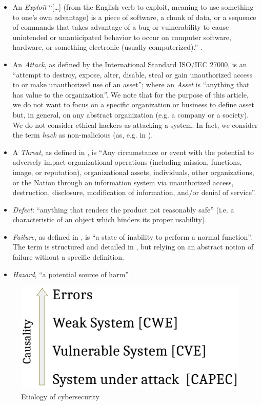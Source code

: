 \documentclass[conference]{IEEEtran}
\begin{document}
\begin{itemize}
	\item An \emph{Exploit} ``[\ldots]
		(from the English verb to exploit, meaning to use something to
		one’s own advantage) is a piece of software, a chunk of data,
		or a sequence of commands that takes advantage of a bug or
		vulnerability to cause unintended or unanticipated behavior to
		occur on computer software, hardware, or something electronic
		(usually computerized).'' \autocite{wiki-exploit}.
	\item An \emph{Attack}, as defined by the International Standard
		ISO/IEC 27000, is an ``attempt to destroy, expose, alter,
		disable, steal or gain unauthorized access to or make
		unauthorized use of an asset''; where an \emph{Asset} is
		``anything that has value to the organization''. We note that for
		the purpose of this article, we do not want to focus on a specific
		organization or business to define asset but, in general, on any 
		abstract organization (e.g. a company or a society).
		We do not consider ethical hackers as attacking a system. 
		In fact, we consider the term \emph{hack} as
		non-malicious (as, e.g. in \autocite{Stallman2002hacker}).
	\item A \emph{Threat}, as defined in \autocite{cnssi20104009}, is ``Any
		circumstance or event with the potential to adversely impact
		organizational operations (including mission, functions, image,
		or reputation), organizational assets, individuals, other
		organizations, or the Nation through an information system via
		unauthorized access, destruction, disclosure, modification of
		information, and/or denial of service''.
	\item \emph{Defect}: ``anything that renders the product not reasonably
		safe'' \autocite{Robinson2019writing} (i.e. a characteristic of
		an object which hinders its proper usability).
	\item \emph{Failure}, as defined in \autocite{Merriam2020failure}, is ``a state of
		inability to perform a normal function''. The term is
		structured and detailed in
		\autocite{cnssi20104009,iet2017glossary}, but relying on an
		abstract notion of failure without a specific definition.
	\item \emph{Hazard}, ``a potential source of
		harm'' \autocite{iet2017glossary}.
\end{itemize}

\begin{figure}[t]
	\centering
	\includegraphics[width=.6\columnwidth]{causality.pdf}
	\caption{Etiology of cybersecurity}
	\label{fig:causality}
\end{figure}
\end{document}
